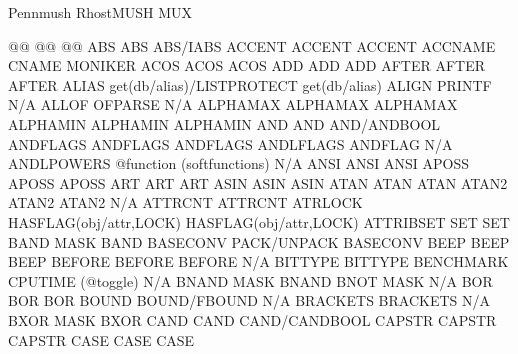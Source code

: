\documentclass[letterpaper,10pt,english]{sphinxmanual}
\begin{document}
\begin{sphinxVerbatim}[commandchars=\\\{\}]
Pennmush                RhostMUSH                    MUX

@@                      @@                           @@
ABS                     ABS                          ABS/IABS
ACCENT                  ACCENT                       ACCENT
ACCNAME                 CNAME                        MONIKER
ACOS                    ACOS                         ACOS
ADD                     ADD                          ADD
AFTER                   AFTER                        AFTER
ALIAS                   get(\PYGZsh{}db/alias)/LISTPROTECT   get(\PYGZsh{}db/alias)
ALIGN                   PRINTF                       N/A
ALLOF                   OFPARSE                      N/A
ALPHAMAX                ALPHAMAX                     ALPHAMAX
ALPHAMIN                ALPHAMIN                     ALPHAMIN
AND                     AND                          AND/ANDBOOL
ANDFLAGS                ANDFLAGS                     ANDFLAGS
ANDLFLAGS               ANDFLAG                      N/A
ANDLPOWERS              @function (softfunctions)    N/A
ANSI                    ANSI                         ANSI
APOSS                   APOSS                        APOSS
ART                     ART                          ART
ASIN                    ASIN                         ASIN
ATAN                    ATAN                         ATAN
ATAN2                   ATAN2                        ATAN2
N/A                     ATTRCNT                      ATTRCNT
ATRLOCK                 HASFLAG(\PYGZsh{}obj/attr,LOCK)      HASFLAG(\PYGZsh{}obj/attr,LOCK)
ATTRIB\PYGZus{}SET              SET                          SET
BAND                    MASK                         BAND
BASECONV                PACK/UNPACK                  BASECONV
BEEP                    BEEP                         BEEP
BEFORE                  BEFORE                       BEFORE
N/A                     BITTYPE                      BITTYPE
BENCHMARK               CPUTIME (@toggle)            N/A
BNAND                   MASK                         BNAND
BNOT                    MASK                         N/A
BOR                     BOR                          BOR
BOUND                   BOUND/FBOUND                 N/A
BRACKETS                BRACKETS                     N/A
BXOR                    MASK                         BXOR
CAND                    CAND                         CAND/CANDBOOL
CAPSTR                  CAPSTR                       CAPSTR
CASE                    CASE                         CASE

\end{sphinxVerbatim}
\end{document}
